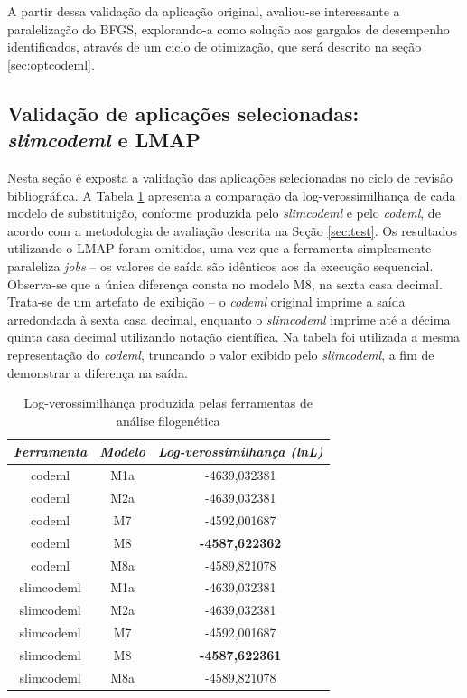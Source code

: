 \documentclass[cic,tc]{iiufrgs}
\begin{document}
A partir dessa validação da aplicação original, avaliou-se interessante a
paralelização do BFGS, explorando-a como solução aos gargalos de desempenho
identificados, através de um ciclo de otimização, que será descrito na seção
\ref{sec:optcodeml}.

\subsection{Validação de aplicações selecionadas: \textit{slimcodeml} e LMAP}
\label{sec:slimeval}

Nesta seção é exposta a validação das aplicações selecionadas no ciclo de
revisão bibliográfica. A Tabela \ref{tbl:log} apresenta a comparação da
log-verossimilhança de cada modelo de substituição, conforme produzida pelo
\textit{slimcodeml} e pelo \textit{codeml}, de acordo com a metodologia de
avaliação descrita na Seção \ref{sec:test}. Os resultados utilizando o LMAP
foram omitidos, uma vez que a ferramenta simplesmente paraleliza \textit{jobs}
-- os valores de saída são idênticos aos da execução sequencial. Observa-se que
a única diferença consta no modelo M8, na sexta casa decimal. Trata-se de um
artefato de exibição -- o \textit{codeml} original imprime a saída arredondada
à sexta casa decimal, enquanto o \textit{slimcodeml} imprime até a décima
quinta casa decimal utilizando notação científica. Na tabela foi utilizada a
mesma representação do \textit{codeml}, truncando o valor exibido pelo
\textit{slimcodeml}, a fim de demonstrar a diferença na saída. 

\begin{table}[h]
    \caption{Log-verossimilhança produzida pelas ferramentas de análise filogenética}
    \centering
        \begin{tabular}{c|c|c}
          \hline
          \textit{Ferramenta}  &   \textit{Modelo} & \textit{Log-verossimilhança (lnL)} \\
          \hline
          \hline
          codeml            & M1a & -4639,032381 \\
          codeml            & M2a & -4639,032381 \\
          codeml            & M7  & -4592,001687 \\
          codeml            & M8  & \textbf{-4587,622362} \\
          codeml            & M8a & -4589,821078 \\
          slimcodeml        & M1a & -4639,032381 \\
          slimcodeml        & M2a & -4639,032381 \\
          slimcodeml        & M7  & -4592,001687 \\
          slimcodeml        & M8  & \textbf{-4587,622361} \\
          slimcodeml        & M8a & -4589,821078 \\
          \hline
        \end{tabular}
    \label{tbl:log}
\end{table}
\end{document}
